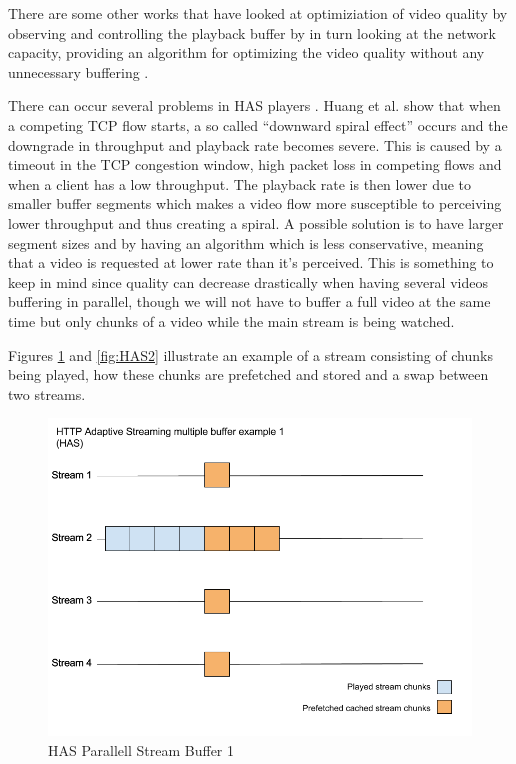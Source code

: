 There are some other works that have looked at optimiziation of video quality by observing and controlling the playback buffer by in turn looking at the network capacity, providing an algorithm for optimizing the video quality without any unnecessary buffering \cite{bufferbased}.


There can occur several problems in HAS players \cite{qualbranch}. Huang et al. \cite{streamrate} show that when a competing TCP flow starts, a so called “downward spiral effect” occurs and the downgrade in throughput and playback rate becomes severe. This is caused by a timeout in the TCP congestion window, high packet loss in competing flows and when a client has a low throughput. The playback rate is then lower due to smaller buffer segments which makes a video flow more susceptible to perceiving lower throughput and thus creating a spiral. A possible solution is to have larger segment sizes and by having an algorithm which is less conservative, meaning that a video is requested at lower rate than it's perceived. This is something to keep in mind since quality can decrease drastically when having several videos buffering in parallel, though we will not have to buffer a full video at the same time but only chunks of a video while the main stream is being watched.

Figures \ref{fig:HAS1} and \ref{fig:HAS2} illustrate an example of a stream consisting of chunks being played, how these chunks are prefetched and stored and a swap between two streams.

\begin{figure}[!ht]
\begin{center}
\includegraphics[scale=0.4]{HAS1.png}
\caption{HAS Parallell Stream Buffer 1}
\label{fig:HAS1}
\end{center}
\end{figure}

